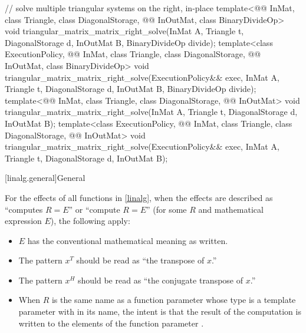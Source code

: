 \begin{codeblock}
{  // solve multiple triangular systems on the right, in-place
  template<@@ InMat, class Triangle, class DiagonalStorage,
           @@ InOutMat, class BinaryDivideOp>
    void triangular_matrix_matrix_right_solve(InMat A, Triangle t, DiagonalStorage d,
                                              InOutMat B, BinaryDivideOp divide);
  template<class ExecutionPolicy,
           @@ InMat, class Triangle, class DiagonalStorage,
           @@ InOutMat, class BinaryDivideOp>
    void triangular_matrix_matrix_right_solve(ExecutionPolicy&& exec,
                                              InMat A, Triangle t, DiagonalStorage d,
                                              InOutMat B, BinaryDivideOp divide);
  template<@@ InMat, class Triangle, class DiagonalStorage, @@ InOutMat>
    void triangular_matrix_matrix_right_solve(InMat A, Triangle t, DiagonalStorage d,
                                              InOutMat B);
  template<class ExecutionPolicy,
           @@ InMat, class Triangle, class DiagonalStorage, @@ InOutMat>
    void triangular_matrix_matrix_right_solve(ExecutionPolicy&& exec,
                                              InMat A, Triangle t, DiagonalStorage d,
                                              InOutMat B);
}
\end{codeblock}

[linalg.general]{General}

\pnum
For the effects of all functions in \ref{linalg},
when the effects are described as
``computes $R = E$'' or ``compute $R = E$''
(for some $R$ and mathematical expression $E$),
the following apply:
\begin{itemize}
\item
$E$ has
      the conventional mathematical meaning as written.
\item
The pattern $x^T$ should be read as
      ``the transpose of $x$.''
\item
The pattern $x^H$ should be read as
      ``the conjugate transpose of $x$.''
\item
When $R$ is the same name as a function parameter
      whose type is a template parameter with  in its name,
      the intent is that the result of the computation
      is written to the elements of the function parameter .
\end{itemize}


